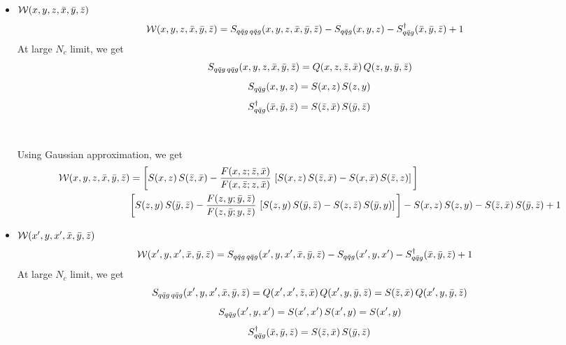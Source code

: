\documentclass[9pt]{article}
\numberwithin{equation}{section}
\begin{document}
\begin{itemize}
    \item $\mathcal{W}(x,y,z,\Bar{x},\Bar{y},\Bar{z})$
    \begin{align}
        \mathcal{W}(x,y,z,\Bar{x},\Bar{y},\Bar{z}) & = S_{q\Bar{q}g\,q\Bar{q}g}(x,y,z,\Bar{x},\Bar{y},\Bar{z}) -S_{q\Bar{q}g}(x,y,z) - S^{\dagger}_{q\Bar{q}g}(\Bar{x},\Bar{y},\Bar{z}) + 1
    \end{align}
At large $N_{c}$ limit, we get
$$S_{q\Bar{q}g\,q\Bar{q}g}(x,y,z,\Bar{x},\Bar{y},\Bar{z}) = Q(x,z,\Bar{z},\Bar{x})\, Q(z,y,\Bar{y},\Bar{z})$$
$$S_{q\Bar{q}g}(x,y,z) = S(x,z)\, S(z,y)$$
$$S^{\dagger}_{q\Bar{q}g}(\Bar{x},\Bar{y},\Bar{z}) = S(\Bar{z},\Bar{x})\, S(\Bar{y},\Bar{z})$$
\\ \\ 
Using Gaussian approximation, we get
\begin{align}
    \mathcal{W}(x,y,z,\Bar{x},\Bar{y},\Bar{z}) & = \bigg[S(x,z)\,S(\Bar{z},\Bar{x}) - \frac{F(x,z;\Bar{z},\Bar{x})}{F(x,\Bar{z};z,\Bar{x})}\, \left[S(x,z)\,S(\Bar{z},\Bar{x})-S(x,\Bar{x})\, S(\Bar{z},z)\right]\bigg]\notag \\ &  \bigg[S(z,y)\,S(\Bar{y},\Bar{z}) - \frac{F(z,y;\Bar{y},\Bar{z})}{F(z,\Bar{y};y,\Bar{z})}\,\left[S(z,y)\,S(\Bar{y},\Bar{z})-S(z,\Bar{z})\,S(\Bar{y},y)\right]\bigg] - S(x,z)\, S(z,y) - S(\Bar{z},\Bar{x})\, S(\Bar{y},\Bar{z}) +1
\end{align}
\item $\mathcal{W}(x',y,x',\Bar{x},\Bar{y},\Bar{z})$
\begin{align}
        \mathcal{W}(x',y,x',\Bar{x},\Bar{y},\Bar{z}) & = S_{q\Bar{q}g\,q\Bar{q}g}(x',y,x',\Bar{x},\Bar{y},\Bar{z}) -S_{q\Bar{q}g}(x',y,x') - S^{\dagger}_{q\Bar{q}g}(\Bar{x},\Bar{y},\Bar{z}) + 1
    \end{align}
At large $N_{c}$ limit, we get
$$S_{q\Bar{q}g\,q\Bar{q}g}(x',y,x',\Bar{x},\Bar{y},\Bar{z}) = Q(x',x',\Bar{z},\Bar{x})\, Q(x',y,\Bar{y},\Bar{z}) = S(\Bar{z},\Bar{x})\,Q(x',y,\Bar{y},\Bar{z})$$
$$S_{q\Bar{q}g}(x',y,x') = S(x',x')\, S(x',y) = S(x',y) $$
$$S^{\dagger}_{q\Bar{q}g}(\Bar{x},\Bar{y},\Bar{z}) = S(\Bar{z},\Bar{x})\, S(\Bar{y},\Bar{z})$$
\\ \\

\end{itemize}
\end{document}
